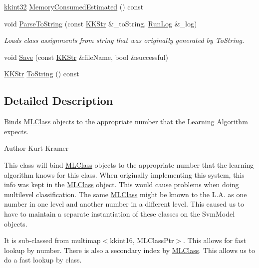 \begin{DoxyCompactItemize}
\item 
\hyperlink{namespace_k_k_b_a8fa4952cc84fda1de4bec1fbdd8d5b1b}{kkint32} \hyperlink{class_k_k_m_l_l_1_1_class_assignments_a9fa44a1925ecd559e96d49a7f4873c27}{Memory\+Consumed\+Estimated} () const 
\item 
void \hyperlink{class_k_k_m_l_l_1_1_class_assignments_a741ad292e58ea0dcd057776fa0a62da7}{Parse\+To\+String} (const \hyperlink{class_k_k_b_1_1_k_k_str}{K\+K\+Str} \&\+\_\+to\+String, \hyperlink{class_k_k_b_1_1_run_log}{Run\+Log} \&\+\_\+log)
\begin{DoxyCompactList}\small\item\em Loads class assignments from string that was originally generated by To\+String. \end{DoxyCompactList}\item 
void \hyperlink{class_k_k_m_l_l_1_1_class_assignments_a4c84be859dfad85963f97558d8b267d9}{Save} (const \hyperlink{class_k_k_b_1_1_k_k_str}{K\+K\+Str} \&file\+Name, bool \&successful)
\item 
\hyperlink{class_k_k_b_1_1_k_k_str}{K\+K\+Str} \hyperlink{class_k_k_m_l_l_1_1_class_assignments_a43cfc29386642162927f4492d5be7abb}{To\+String} () const 
\end{DoxyCompactItemize}


\subsection{Detailed Description}
Binds \hyperlink{class_k_k_m_l_l_1_1_m_l_class}{M\+L\+Class} objects to the appropriate number that the Learning Algorithm expects. 

\begin{DoxyAuthor}{Author}
Kurt Kramer
\end{DoxyAuthor}
This class will bind \hyperlink{class_k_k_m_l_l_1_1_m_l_class}{M\+L\+Class} objects to the appropriate number that the learning algorithm knows for this class. When originally implementing this system, this info was kept in the \hyperlink{class_k_k_m_l_l_1_1_m_l_class}{M\+L\+Class} object. This would cause problems when doing multilevel classification. The same \hyperlink{class_k_k_m_l_l_1_1_m_l_class}{M\+L\+Class} might be known to the L.\+A. as one number in one level and another number in a different level. This caused us to have to maintain a separate instantiation of these classes on the Svm\+Model objects.

It is sub-\/classed from multimap$<$kkint16, M\+L\+Class\+Ptr$>$. This allows for fast lookup by number. There is also a secondary index by \hyperlink{class_k_k_m_l_l_1_1_m_l_class}{M\+L\+Class}. This allows us to do a fast lookup by class. 

